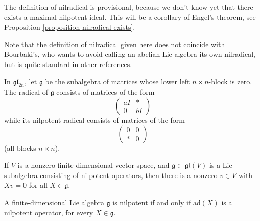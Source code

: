 The definition of nilradical is provisional, because we don't know yet that there exists a maximal nilpotent ideal. This will be a corollary of Engel's theorem, see Proposition \ref{proposition-nilradical-exists}.

Note that the definition of nilradical given here does not coincide with Bourbaki's, who wants to avoid calling an abelian Lie algebra its own nilradical, but is quite standard in other references.

\begin{example}
 \label{example-radical}
 In $\mathfrak{gl}_{2n}$, let $\mathfrak g$ be the subalgebra of matrices whose lower left $n\times n$-block is zero. The radical of $\mathfrak g$ consists of matrices of the form
 $$ \begin{pmatrix}
     aI & * \\ 0 & bI
    \end{pmatrix}$$
 while its nilpotent radical consists of matrices of the form 
 $$ \begin{pmatrix}
     0 & 0 \\ *& 0
    \end{pmatrix}$$
 (all blocks $n\times n$).  

\end{example}



\begin{theorem}
 \label{theorem-Engel}
If $V$ is a nonzero finite-dimensional vector space, and $\mathfrak g\subset \mathfrak{gl}(V)$ is a Lie subalgebra consisting of nilpotent operators, then there is a nonzero $v\in V$ with $Xv = 0$ for all $X\in \mathfrak g$.
 
A finite-dimensional Lie algebra $\mathfrak g$ is nilpotent if and only if $\text{ad}(X)$ is a nilpotent operator, for every $X\in \mathfrak g$. 
\end{theorem}

